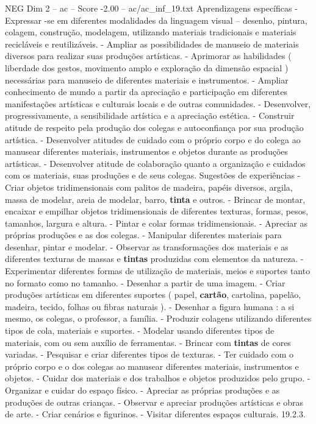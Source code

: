 \begin{textsample}{NEG Dim 2 – ac – Score -2.00 – ac/ac\_inf\_19.txt}
Aprendizagens específicas - Expressar -se em diferentes modalidades da linguagem visual – desenho, pintura, colagem, construção, modelagem, utilizando materiais tradicionais e materiais recicláveis e reutilizáveis. - Ampliar as possibilidades de manuseio de materiais diversos para realizar suas produções artísticas. - Aprimorar as habilidades ( liberdade dos gestos, movimento amplo e exploração da dimensão espacial ) necessárias para manuseio de diferentes materiais e instrumentos. - Ampliar conhecimento de mundo a partir da apreciação e participação em diferentes manifestações artísticas e culturais locais e de outras comunidades. - Desenvolver, progressivamente, a sensibilidade artística e a apreciação estética. - Construir atitude de respeito pela produção dos colegas e autoconfiança por sua produção artística. - Desenvolver atitudes de cuidado com o próprio corpo e do colega ao manusear diferentes materiais, instrumentos e objetos durante as produções artísticas. - Desenvolver atitude de colaboração quanto a organização e cuidados com os materiais, suas produções e de seus colegas.
Sugestões de experiências - Criar objetos tridimensionais com palitos de madeira, papéis diversos, argila, massa de modelar, areia de modelar, barro, \textbf{tinta} e outros. - Brincar de montar, encaixar e empilhar objetos tridimensionais de diferentes texturas, formas, pesos, tamanhos, largura e altura. - Pintar e colar formas tridimensionais. - Apreciar as próprias produções e as dos colegas. - Manipular diferentes materiais para desenhar, pintar e modelar. - Observar as transformações dos materiais e as diferentes texturas de massas e \textbf{tintas} produzidas com elementos da natureza. - Experimentar diferentes formas de utilização de materiais, meios e suportes tanto no formato como no tamanho. - Desenhar a partir de uma imagem. - Criar produções artísticas em diferentes suportes ( papel, \textbf{cartão}, cartolina, papelão, madeira, tecido, folhas ou fibras naturais ). - Desenhar a figura humana : a si mesmo, os colegas, o professor, a família. - Produzir colagens utilizando diferentes tipos de cola, materiais e suportes. - Modelar usando diferentes tipos de materiais, com ou sem auxílio de ferramentas. - Brincar com \textbf{tintas} de cores variadas. - Pesquisar e criar diferentes tipos de texturas. - Ter cuidado com o próprio corpo e o dos colegas ao manusear diferentes materiais, instrumentos e objetos. - Cuidar dos materiais e dos trabalhos e objetos produzidos pelo grupo. - Organizar e cuidar do espaço físico. - Apreciar as próprias produções e as produções de outras crianças. - Observar e apreciar produções artísticas e obras de arte. - Criar cenários e figurinos. - Visitar diferentes espaços culturais. 19.2.3.

\end{textsample}
